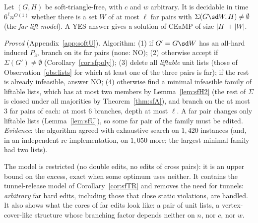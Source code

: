 \begin{theorem}\label{thm:U}
Let $(G,H)$ be soft-triangle-free, with $c$ and $w$ arbitrary. It is decidable in time $6^{\ell}n^{O(1)}$ whether there is a set $W$ of at most $\ell$ far pairs with $\Sigma(G\sd W,H)\ne\emptyset$ (the \emph{far-lift model}). A YES answer gives a solution of CEaMP of size $|H|+|W|$.
\end{theorem}
\emph{Proved} (Appendix~\ref{app:softU}). Algorithm: (1) if $G'=G\sd W$ has an all-hard induced $P_3$, branch on its far pairs (none: NO); (2) otherwise accept if $\Sigma(G')\ne\emptyset$ (Corollary~\ref{cor:sfpoly}); (3) delete all \emph{liftable} unit lists (those of Observation~\ref{obs:lists} for which at least one of the three pairs is far); if the rest is already infeasible, answer NO; (4) otherwise find a minimal infeasible family of liftable lists, which has at most two members by Lemma~\ref{lem:sfH2} (the rest of $\Sigma$ is closed under all majorities by Theorem~\ref{thm:sfA}), and branch on the at most $3$ far pairs of each: at most $6$ branches, depth at most $\ell$. A far pair changes only liftable lists (Lemma~\ref{lem:sfU}), so some far pair of the family must be edited. \emph{Evidence}: the algorithm agreed with exhaustive search on $1{,}420$ instances (and, in an independent re-implementation, on $1{,}050$ more; the largest minimal family had two lists).

The model is restricted (no double edits, no edits of cross pairs): it is an upper bound on the excess, exact when some optimum uses neither. It contains the tunnel-release model of Corollary~\ref{cor:sfTR} and removes the need for tunnels: \emph{arbitrary} far hard edits, including those that close static violations, are handled. It also shows what the cores of far edits look like: a pair of unit lists, a vertex-cover-like structure whose branching factor depends neither on $n$, nor $c$, nor $w$.

